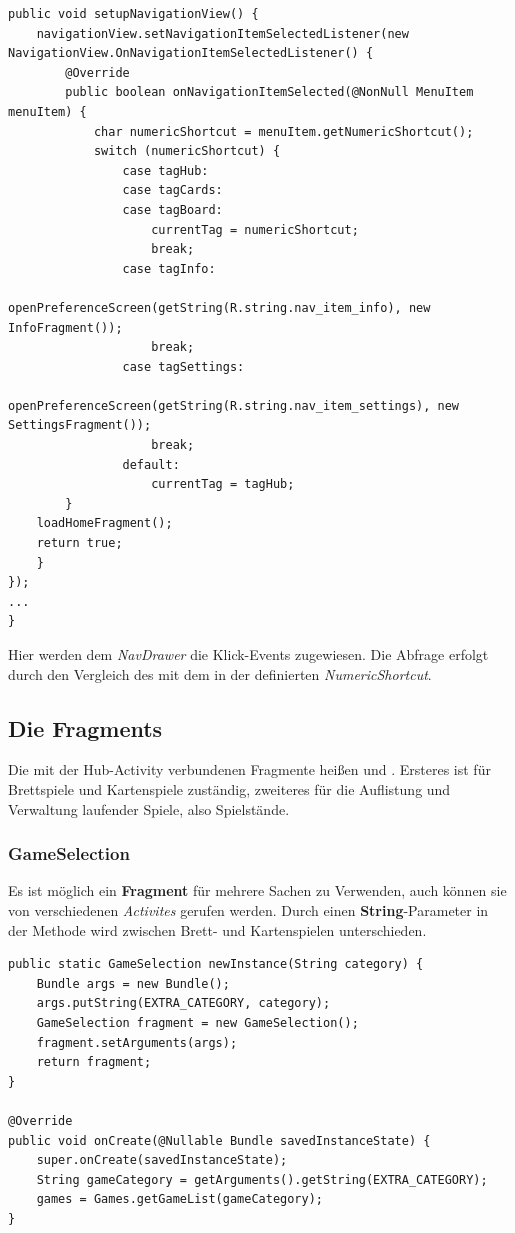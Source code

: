 \begin{lstlisting}[caption={Hub setupNavigationView() Methode},captionpos=b]
public void setupNavigationView() {
	navigationView.setNavigationItemSelectedListener(new NavigationView.OnNavigationItemSelectedListener() {
		@Override
		public boolean onNavigationItemSelected(@NonNull MenuItem menuItem) {
			char numericShortcut = menuItem.getNumericShortcut();
			switch (numericShortcut) {
				case tagHub:
				case tagCards:
				case tagBoard:
					currentTag = numericShortcut;
					break;
				case tagInfo:
					openPreferenceScreen(getString(R.string.nav_item_info), new InfoFragment());
					break;
				case tagSettings:
					openPreferenceScreen(getString(R.string.nav_item_settings), new SettingsFragment());
					break;
				default:
					currentTag = tagHub;
		}
	loadHomeFragment();
	return true;
	}
});
...
}
\end{lstlisting}

Hier werden dem \emph{NavDrawer} die Klick-Events zugewiesen. Die Abfrage
erfolgt durch den Vergleich des  mit dem in der
 definierten \emph{NumericShortcut}.

\subsection{Die Fragments}

Die mit der Hub-Activity verbundenen Fragmente heißen  und
. Ersteres ist für Brettspiele und Kartenspiele zuständig, zweiteres
für die Auflistung und Verwaltung laufender Spiele, also Spielstände.

\subsubsection{GameSelection}

Es ist möglich ein \textbf{Fragment} für mehrere Sachen zu Verwenden, auch können
sie von verschiedenen \emph{Activites} gerufen werden. Durch einen
\textbf{String}-Parameter in der Methode  wird
zwischen Brett- und Kartenspielen unterschieden.

\begin{lstlisting}[caption={Hub setupNavigationView() Methode},captionpos=b]
public static GameSelection newInstance(String category) {
	Bundle args = new Bundle();
	args.putString(EXTRA_CATEGORY, category);	
	GameSelection fragment = new GameSelection();
	fragment.setArguments(args);
	return fragment;
}

@Override
public void onCreate(@Nullable Bundle savedInstanceState) {
	super.onCreate(savedInstanceState);
	String gameCategory = getArguments().getString(EXTRA_CATEGORY);
	games = Games.getGameList(gameCategory);
}
\end{lstlisting}

